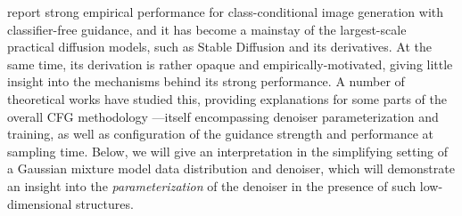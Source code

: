 \documentclass[../../book-main.tex]{subfiles}
\begin{document}
\textcite{Ho2022-ry} report strong empirical performance for class-conditional
image generation with classifier-free guidance, and it has become a mainstay of
the largest-scale practical diffusion models, such as Stable Diffusion
\cite{rombach2022high} and its derivatives.
At the same time, its derivation is rather opaque and empirically-motivated,
giving little insight into the mechanisms behind its strong performance.
A number of theoretical works have studied this, providing explanations for some
parts of the overall CFG methodology
\cite{Bradley2024-jg,Li2025-li,Wu2024-js}---itself encompassing denoiser
parameterization and training, as well as configuration of the guidance strength
and performance at sampling time.
Below, we will give an interpretation in the simplifying setting
of a Gaussian mixture model data distribution and denoiser, which will
demonstrate %
an insight into the \textit{parameterization} of the denoiser in the presence of
such low-dimensional structures.

\end{document}
